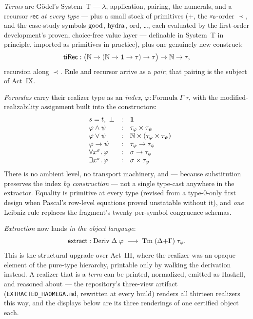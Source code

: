 \emph{Terms} are G\"odel's System~T --- $\lambda$, application, pairing, the
numerals, and a recursor $\mathsf{rec}$ \emph{at every type} --- plus a small
stock of primitives ($+$, the $\varepsilon_0$-order $\prec$, and the case-study
symbols $\operatorname{good}$, $\operatorname{hydra}$, $\mathrm{ord}$, \dots, each evaluated by the
first-order development's proven, choice-free value layer --- definable in
System~T in principle, imported as primitives in practice), plus one
genuinely new construct:
\[
  \mathsf{tiRec} : \bigl(\mathbb{N} \to (\mathbb{N} \to \mathbf{1} \to \tau) \to
  \tau\bigr) \to \mathbb{N} \to \tau ,
\]
recursion along $\prec$. Rule and recursor arrive as a \emph{pair}; that
pairing is the subject of Act~IX.

\emph{Formulas} carry their realizer type as an \emph{index},
$\varphi : \mathrm{Formula}\;\Gamma\;\tau$, with the modified-realizability
assignment built into the constructors:
\[
\begin{array}{llcl}
  & s = t,\ \bot &:& \mathbf{1}\\
  & \varphi \land \psi &:& \tau_\varphi \times \tau_\psi\\
  & \varphi \lor \psi &:& \mathbb{N} \times (\tau_\varphi \times \tau_\psi)\\
  & \varphi \to \psi &:& \tau_\varphi \to \tau_\psi\\
  & \forall x^{\sigma}.\,\varphi &:& \sigma \to \tau_\varphi\\
  & \exists x^{\sigma}.\,\varphi &:& \sigma \times \tau_\varphi
\end{array}
\]
There is no ambient level, no transport machinery, and --- because
substitution preserves the index \emph{by construction} --- not a single
type-cast anywhere in the extractor. Equality is primitive at every type
(revised from a type-$0$-only first design when Pascal's row-level equations
proved unstatable without it), and \emph{one} Leibniz rule replaces the
fragment's twenty per-symbol congruence schemas.

\emph{Extraction} now lands \emph{in the object language}:
\[
  \mathsf{extract} : \mathrm{Deriv}\;\Delta\;\varphi \;\longrightarrow\;
  \mathrm{Tm}\;(\Delta{+}\Gamma)\;\tau_\varphi .
\]
This is the structural upgrade over Act~III, where the realizer was an
opaque element of the pure-type hierarchy, printable only by walking the
derivation instead. A realizer that is a \emph{term} can be printed,
normalized, emitted as Haskell, and reasoned about --- the repository's
three-view artifact (\texttt{EXTRACTED\_HAOMEGA.md}, rewritten at every
build) renders all thirteen realizers this way, and the displays below are its
three renderings of one certified object each.

